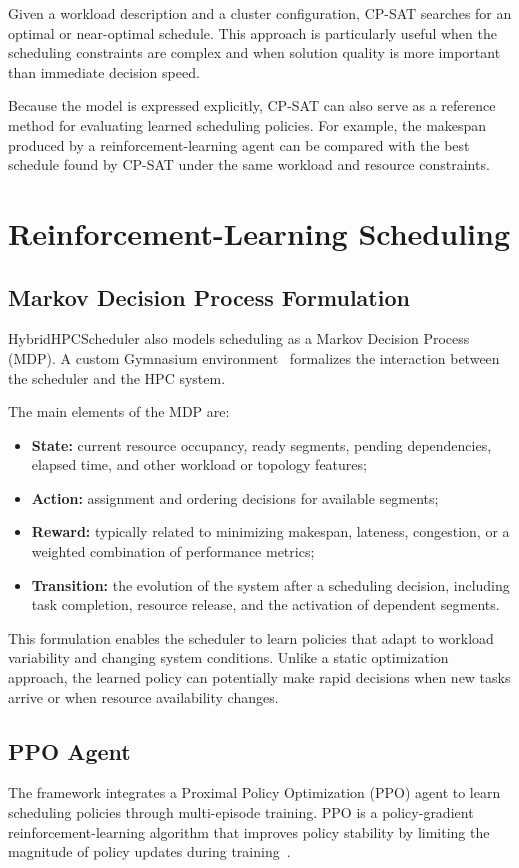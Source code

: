 \documentclass[conference]{IEEEtran}
\begin{document}
Given a workload description and a cluster configuration, CP-SAT searches for
an optimal or near-optimal schedule. This approach is particularly useful when
the scheduling constraints are complex and when solution quality is more
important than immediate decision speed.

Because the model is expressed explicitly, CP-SAT can also serve as a reference
method for evaluating learned scheduling policies. For example, the makespan
produced by a reinforcement-learning agent can be compared with the best
schedule found by CP-SAT under the same workload and resource constraints.

\section{Reinforcement-Learning Scheduling}
\subsection{Markov Decision Process Formulation}
HybridHPCScheduler also models scheduling as a Markov Decision Process (MDP).
A custom Gymnasium environment~\cite{gymnasium} formalizes the interaction
between the scheduler and the HPC system.

The main elements of the MDP are:
\begin{itemize}
    \item \textbf{State:} current resource occupancy, ready segments, pending
    dependencies, elapsed time, and other workload or topology features;
    \item \textbf{Action:} assignment and ordering decisions for available
    segments;
    \item \textbf{Reward:} typically related to minimizing makespan, lateness,
    congestion, or a weighted combination of performance metrics;
    \item \textbf{Transition:} the evolution of the system after a scheduling
    decision, including task completion, resource release, and the activation
    of dependent segments.
\end{itemize}

This formulation enables the scheduler to learn policies that adapt to workload
variability and changing system conditions. Unlike a static optimization
approach, the learned policy can potentially make rapid decisions when new
tasks arrive or when resource availability changes.

\subsection{PPO Agent}
The framework integrates a Proximal Policy Optimization (PPO) agent to learn
scheduling policies through multi-episode training. PPO is a policy-gradient
reinforcement-learning algorithm that improves policy stability by limiting the
magnitude of policy updates during training~\cite{ppo}.
\end{document}
